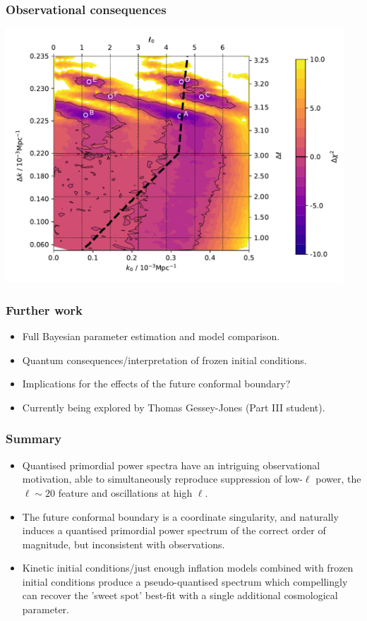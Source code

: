 \documentclass[%
]{beamer}
\begin{document}
\begin{frame}
    \frametitle{Observational consequences}
    \centerline{%
        \includegraphics[width=0.95\textwidth]{haddadin}
    }
\end{frame}

\begin{frame}
    \frametitle{Further work}
    \begin{itemize}
        \item Full Bayesian parameter estimation and model comparison.
        \item Quantum consequences/interpretation of frozen initial conditions.
        \item Implications for the effects of the future conformal boundary?
        \item Currently being explored by Thomas Gessey-Jones (Part III student).
    \end{itemize}
\end{frame}

\begin{frame}
    \frametitle{Summary}
    \begin{itemize}
        \item Quantised primordial power spectra have an intriguing observational motivation, able to simultaneously reproduce suppression of low-$\ell$ power, the $\ell\sim20$ feature and oscillations at high $\ell$.
        \item The future conformal boundary is a coordinate singularity, and naturally induces a quantised primordial power spectrum of the correct order of magnitude, but inconsistent with observations.
        \item Kinetic initial conditions/just enough inflation models combined with frozen initial conditions produce a pseudo-quantised spectrum which compellingly can recover the 'sweet spot' best-fit with a single additional cosmological parameter.
    \end{itemize}
\end{frame}
\end{document}
